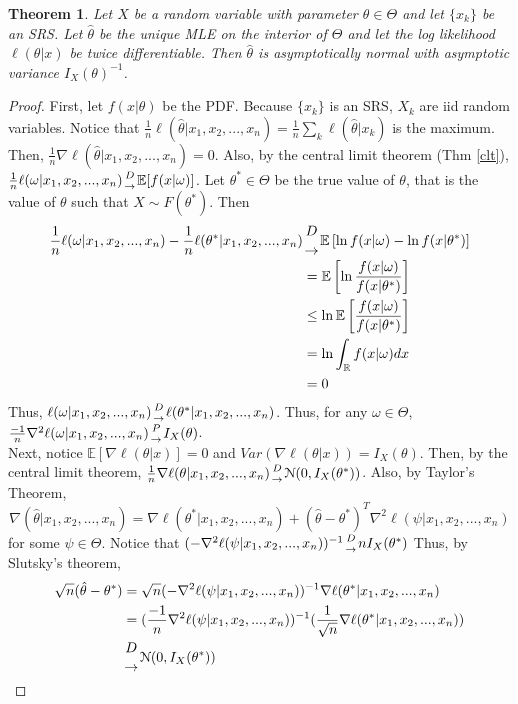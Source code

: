 \documentclass{article}
\newtheorem{theorem}{Theorem}
\theoremstyle{definition}\newtheorem{definition}{DEF}
\theoremstyle{definition}\newtheorem{example}{Ex}
\theoremstyle{lemma}\newtheorem{lemma}{Lemma}
\theoremstyle{corrolary}\newtheorem{corrolary}{Cor}
\begin{document}
\begin{theorem}
Let $X$ be a random variable with parameter $\theta\in \Theta$ and let $\{x_k\}$ be an SRS.
Let $\hat{\theta}$ be the unique MLE on the interior of $\Theta$ and let the log likelihood $\ell (\theta | x)$ be twice differentiable.
Then $\hat{\theta}$ is asymptotically normal with asymptotic variance $I_X(\theta)^{-1}$.
\end{theorem}
\begin{proof}
First, let $f(x|\theta)$ be the PDF.
Because $\{x_k\}$ is an SRS, $X_k$ are iid random variables.
Notice that $\frac{1}{n}\ell(\hat{\theta}|x_1, x_2, ..., x_n)=\frac{1}{n}\sum_k \ell(\hat{\theta}|x_k)$ is the maximum.
Then, $\frac{1}{n} \nabla \ell (\hat{\theta} | x_1, x_2, ..., x_n) = 0$.
Also, by the central limit theorem (Thm \ref{clt}), $\frac{1}{n} \ell(\omega | x_1, x_2, ..., x_n) {D \atop \rightarrow} \mathbb{E}[f(x|\omega)]$.
Let $\theta^*\in \Theta$ be the true value of $\theta$, that is the value of $\theta$ such that $X\sim F(\theta^*)$.
Then
\begin{align*}
\frac{1}{n} \ell (\omega | x_1, x_2, ..., x_n) - \frac{1}{n} \ell (\theta^* | x_1, x_2, ..., x_n)
&{D \atop \rightarrow} \mathbb{E}\left[ \ln f(x|\omega) - \ln f(x|\theta^*)\right] \\
&= \mathbb{E}\left[ \ln \frac{f(x|\omega)}{f(x|\theta^*)}\right] \\
&\leq \ln \mathbb{E} \left[ \frac{f(x|\omega)}{f(x|\theta^*)}\right] \\
&= \ln \int_\mathbb{R} f(x|\omega) dx \\
&= 0
\end{align*}
Thus, $\ell(\omega | x_1, x_2, ..., x_n) {D \atop \rightarrow} \ell (\theta^* | x_1, x_2, ..., x_n)$.
Thus, for any $\omega \in \Theta$, $\frac{-1}{n} \nabla^2 \ell(\omega | x_1, x_2, ..., x_n) {P \atop \rightarrow} I_X(\theta)$. \\
Next, notice $\mathbb{E}[\nabla \ell(\theta|x)]=0$ and $Var(\nabla\ell (\theta|x)) = I_X(\theta)$.
Then, by the central limit theorem, $\frac{1}{n} \nabla \ell(\theta | x_1, x_2, ..., x_n) {D\atop \rightarrow} \mathcal{N}(0, I_X(\theta^*))$.
Also, by Taylor's Theorem, 
\begin{equation*}
\nabla(\hat{\theta} | x_1, x_2, ..., x_n) = \nabla \ell(\theta^* | x_1, x_2, ..., x_n) + (\hat{\theta} - \theta^*)^T \nabla^2 \ell (\psi | x_1, x_2, ..., x_n)
\end{equation*}
for some $\psi \in \Theta$.
Notice that $(- \nabla^2 \ell(\psi | x_1, x_2, ..., x_n))^{-1} {D\atop \rightarrow} nI_X(\theta^*)$
Thus, by Slutsky's theorem, 
\begin{align*}
\sqrt{n} (\hat{\theta} - \theta^*) 
&= \sqrt{n} (-\nabla^2 \ell(\psi | x_1, x_2, ..., x_n))^{-1} \nabla \ell (\theta^* | x_1, x_2, ..., x_n) \\
&= (\frac{-1}{n} \nabla^2 \ell(\psi | x_1, x_2, ..., x_n))^{-1} (\frac{1}{\sqrt{n}} \nabla \ell (\theta^* | x_1, x_2, ..., x_n)) \\
&{D \atop \rightarrow} \mathcal{N}(0, I_X(\theta^*))
\end{align*}
\end{proof}
\end{document}
